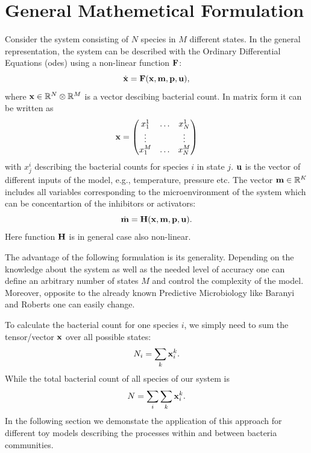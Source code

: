 \documentclass[10pt,A4paper]{article}
\begin{document}
\section{General Mathemetical Formulation}
Consider the system consisting of $N$ species in $M$ different states.
In the general representation, the system can be described with the Ordinary Differential Equations (\acp{ode}) using a non-linear function $\mathbf{F}$:
\begin{equation}
   \dot{\mathbf{x}} = \mathbf{F}(\mathbf{x}, \mathbf{m}, \mathbf{p}, \mathbf{u}),
   \label{eq:model_ODE}
\end{equation}
where  $\mathbf{x} \in \mathbb{R}^{N}  \otimes \mathbb{R}^{M}$ is a vector descibing bacterial count.
In matrix form it can be written as
\begin{equation}
    \mathbf{x} = \begin{pmatrix}
        x^1_1  & \dots & x^1_N  \\
        \vdots &       & \vdots \\
        x^M_1  & \dots & x^M_N  \\
            \end{pmatrix}
    \label{eq:model_bact}
\end{equation}
with $x_{j}^{i}$ describing the bacterial counts for species $i$ in state $j$.
$\mathbf{u}$ is the vector of different inputs of the model, e.g., temperature, pressure etc.
The vector $\mathbf{m} \in \mathbb{R}^{K}$ includes all variables corresponding to the microenvironment of the system which can be concentartion of the inhibitors or activators:
\begin{equation}
    \dot{\mathbf{m}} = \mathbf{H} (\mathbf{x}, \mathbf{m}, \mathbf{p}, \mathbf{u}).
    \label{eq:model_microenv}
\end{equation}
Here function $\mathbf{H}$ is in general case also non-linear.

The advantage of the following formulation is its generality. 
Depending on the knowledge about the system as well as the needed level of accuracy one can define an arbitrary number of states $M$ and control the complexity of the model.
Moreover, opposite to the already known Predictive Microbiology like Baranyi and Roberts one can easily change.

To calculate the bacterial count for one species $i$, we simply need to sum the tensor/vector $\mathbf{x}$ over all possible states:
\begin{equation}
    N_i = \sum_k \mathbf{x}_i^k.
\end{equation}
While the total bacterial count of all species of our system is
\begin{equation}
    N = \sum_i \sum_k \mathbf{x}_i^k.
\end{equation}
In the following section we demonstate the application of this approach for different toy models describing the processes within and between bacteria communities.
\newpage
%
%
%
%
\end{document}
